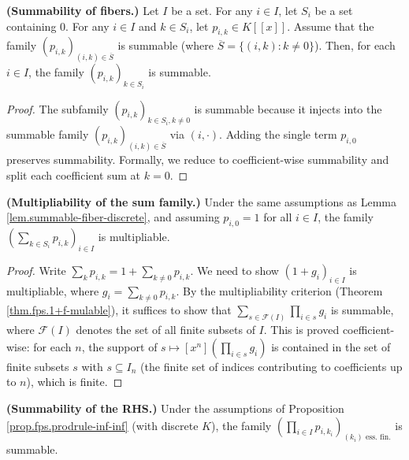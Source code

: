\begin{lemma}
\label{lem.summable-fiber-discrete}
\leanhelper
\leanok
\textbf{(Summability of fibers.)}
Let $I$ be a set. For any $i\in I$, let $S_i$ be a set containing $0$.
For any $i\in I$ and $k\in S_i$, let $p_{i,k}\in K[[x]]$.
Assume that the family $(p_{i,k})_{(i,k)\in\overline{S}}$ is summable
(where $\overline{S} = \{(i,k) : k\ne 0\}$).
Then, for each $i\in I$, the family $(p_{i,k})_{k\in S_i}$ is summable.
\end{lemma}

\begin{proof}
The subfamily $(p_{i,k})_{k\in S_i, k\ne 0}$ is summable because it injects
into the summable family $(p_{i,k})_{(i,k)\in\overline{S}}$ via
$(i,\cdot)$. Adding the single term $p_{i,0}$ preserves summability.
Formally, we reduce to coefficient-wise summability and split each coefficient
sum at $k=0$.
\end{proof}

\begin{lemma}
\label{lem.multipliable-tsum-fiber-discrete}
\leanhelper
\leanok
\textbf{(Multipliability of the sum family.)}
Under the same assumptions as Lemma \ref{lem.summable-fiber-discrete},
and assuming $p_{i,0}=1$ for all $i\in I$,
the family $\left(\sum_{k\in S_i} p_{i,k}\right)_{i\in I}$ is multipliable.
\end{lemma}

\begin{proof}
\leanok
Write $\sum_k p_{i,k} = 1 + \sum_{k\ne 0} p_{i,k}$.
We need to show $(1 + g_i)_{i\in I}$ is multipliable,
where $g_i = \sum_{k\ne 0} p_{i,k}$.
By the multipliability criterion (Theorem \ref{thm.fps.1+f-mulable}), it suffices to show
that $\sum_{s \in \mathcal{F}(I)} \prod_{i\in s} g_i$ is summable,
where $\mathcal{F}(I)$ denotes the set of all finite subsets of $I$.
This is proved coefficient-wise: for each $n$, the support of
$s\mapsto [x^n](\prod_{i\in s}g_i)$ is contained in the set of finite subsets
$s$ with $s\subseteq I_n$ (the finite set of indices contributing to
coefficients up to $n$), which is finite.
\end{proof}

\begin{lemma}
\label{lem.summable-prod-essentiallyFinite-discrete}
\leanhelper
\leanok
\textbf{(Summability of the RHS.)}
Under the assumptions of Proposition \ref{prop.fps.prodrule-inf-inf} (with discrete $K$),
the family $\left(\prod_{i\in I} p_{i,k_i}\right)_{(k_i)\text{ ess.\ fin.}}$
is summable.
\end{lemma}

